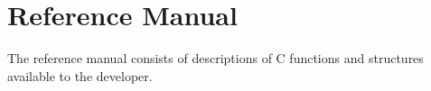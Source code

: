 
\chapter{Reference Manual}
\label{Reference Manual}

The reference manual consists of descriptions of \parflow{}
C functions and structures available to the developer.

